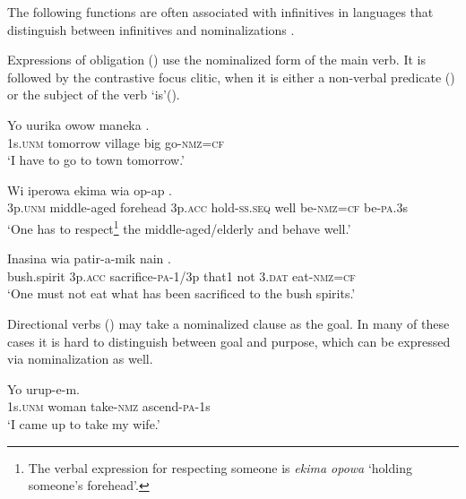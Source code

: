 The following functions are often associated with infinitives in languages that distinguish between infinitives and nominalizations \citep[207]{Ylikoski2003}. 

Expressions of obligation () use the nominalized form of the main verb. It is followed by the contrastive focus clitic, when it is either a non-verbal predicate () or the subject of the verb  `is'().

\ea%
\label{ex:x1242}
\gll Yo  uurika  owow  maneka  . \\
     1s.\textsc{unm}  tomorrow  village  big  go-\textsc{nmz}=\textsc{cf} \\
\glt `I have to go to town tomorrow.'
\z

\ea%
\label{ex:x1243}
\gll Wi  iperowa  ekima  wia  op-ap    . \\
     3p.\textsc{unm}  middle-aged  forehead  3p.\textsc{acc}  hold-\textsc{ss}.\textsc{seq}  well be-\textsc{nmz}=\textsc{cf}  be-\textsc{pa}.3s \\
\glt `One has to respect\footnote{The verbal expression for respecting someone is \textit{ekima opowa} `holding someone's forehead'.} the middle-aged/elderly and behave well.'
\z

\ea%
\label{ex:x1244}
\gll Inasina  wia  patir-a-mik  nain    . \\
     bush.spirit  3p.\textsc{acc}  sacrifice-\textsc{pa}-1/3p  that1  not  3.\textsc{dat} eat-\textsc{nmz}=\textsc{cf} \\
\glt `One must not eat what has been sacrificed to the bush spirits.'
\z

Directional verbs () may take a nominalized clause as the goal. In many of these cases it is hard to distinguish between goal and purpose, which can be expressed via nominalization as well.

\ea%
\label{ex:x1245}
\gll Yo     urup-e-m. \\
     1s.\textsc{unm}  woman  take-\textsc{nmz}  ascend-\textsc{pa}-1s \\
\glt `I came up to take my wife.'
\z

